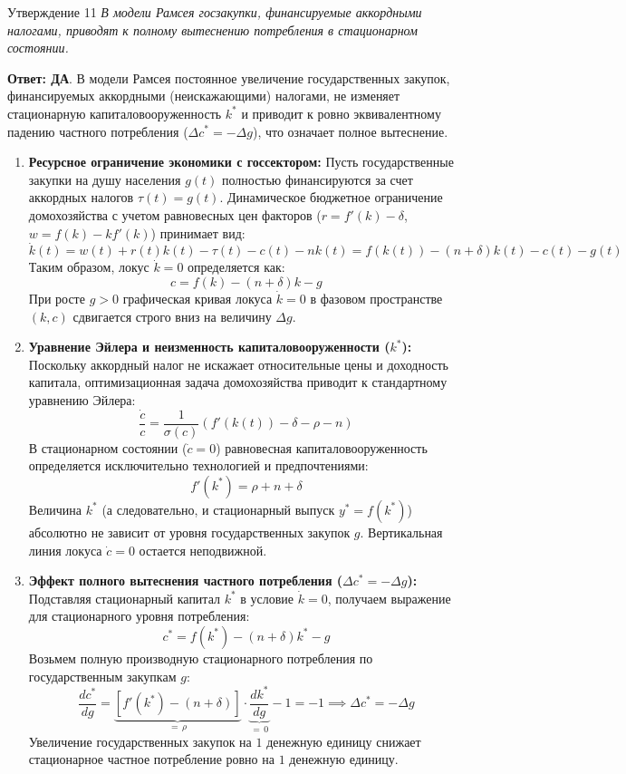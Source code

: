 \documentclass[10pt,a4paper]{article}
\newcommand{\qda}{\textbf{\color{yesgreen}Ответ: ДА}}
\newenvironment{answer}[2]{%
  \begin{qbox}{Утверждение #1}
  \textit{#2}\par\smallskip
}{%
  \end{qbox}\vspace{2pt}
}
\begin{document}
\begin{answer}{11}{В модели Рамсея госзакупки, финансируемые аккордными налогами, приводят к полному вытеснению потребления в стационарном состоянии.}
\qda. В модели Рамсея постоянное увеличение государственных закупок, финансируемых аккордными (неискажающими) налогами, не изменяет стационарную капиталовооруженность $k^*$ и приводит к ровно эквивалентному падению частного потребления ($\Delta c^* = -\Delta g$), что означает полное вытеснение.

\begin{enumerate}
    \item \textbf{Ресурсное ограничение экономики с госсектором:}
    Пусть государственные закупки на душу населения $g(t)$ полностью финансируются за счет аккордных налогов $\tau(t) = g(t)$. Динамическое бюджетное ограничение домохозяйства с учетом равновесных цен факторов ($r = f'(k) - \delta$, $w = f(k) - k f'(k)$) принимает вид:
    \[
    \dot{k}(t) = w(t) + r(t)k(t) - \tau(t) - c(t) - n k(t) = f(k(t)) - (n + \delta)k(t) - c(t) - g(t)
    \]
    Таким образом, локус $\dot{k} = 0$ определяется как:
    \[
    c = f(k) - (n + \delta)k - g
    \]
    При росте $g > 0$ графическая кривая локуса $\dot{k} = 0$ в фазовом пространстве $(k, c)$ сдвигается строго вниз на величину $\Delta g$.

    \item \textbf{Уравнение Эйлера и неизменность капиталовооруженности ($k^*$):}
    Поскольку аккордный налог не искажает относительные цены и доходность капитала, оптимизационная задача домохозяйства приводит к стандартному уравнению Эйлера:
    \[
    \frac{\dot{c}}{c} = \frac{1}{\sigma(c)} \left( f'(k(t)) - \delta - \rho - n \right)
    \]
    В стационарном состоянии ($\dot{c} = 0$) равновесная капиталовооруженность определяется исключительно технологией и предпочтениями:
    \[
    f'(k^*) = \rho + n + \delta
    \]
    Величина $k^*$ (а следовательно, и стационарный выпуск $y^* = f(k^*)$) абсолютно не зависит от уровня государственных закупок $g$. Вертикальная линия локуса $\dot{c} = 0$ остается неподвижной.

    \item \textbf{Эффект полного вытеснения частного потребления ($\Delta c^* = -\Delta g$):}
    Подставляя стационарный капитал $k^*$ в условие $\dot{k} = 0$, получаем выражение для стационарного уровня потребления:
    \[
    c^* = f(k^*) - (n + \delta)k^* - g
    \]
    Возьмем полную производную стационарного потребления по государственным закупкам $g$:
    \[
    \frac{dc^*}{dg} = \underbrace{\left[ f'(k^*) - (n + \delta) \right]}_{=\,\rho} \cdot \underbrace{\frac{dk^*}{dg}}_{=\,0} - 1 = -1 \implies \Delta c^* = -\Delta g
    \]
    Увеличение государственных закупок на $1$ денежную единицу снижает стационарное частное потребление ровно на $1$ денежную единицу.


\end{enumerate}
\end{answer}
\end{document}
